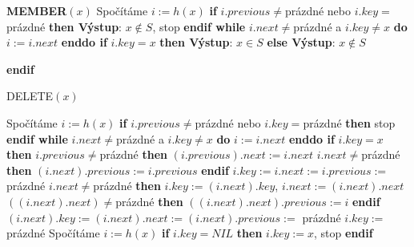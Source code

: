 \documentclass[a4paper,12pt]{article}
\begin{document}
{\bf MEMBER$(x)$}\newline 
Spočítáme $i:=h(x)$\newline 
{\bf if} $i.previous\ne$prázdné nebo $i.key=$prázdné {\bf then Výstup}: $
x\notin S$, stop {\bf endif \newline 
while} $i.next\ne$prázdné a $i.key\ne x$ {\bf do} $i:=i.next$ {\bf enddo\newline 
if} $i.key=x$ {\bf then Výstup}: $x\in S$ {\bf else Výstup}: $
x\notin S$ {\bf endif

DELETE$(x)$}\newline 
Spočítáme $i:=h(x)$\newline 
{\bf if} $i.previous\ne$prázdné nebo $i.key=$prázdné {\bf then} stop {\bf endif\newline 
while} $i.next\ne$prázdné a $i.key\ne x$ {\bf do} $i:=i.next$ {\bf enddo \newline 
if} $i.key=x$ {\bf then}\newline  
\phantom{---}{\bf if} $i.previous\ne$prázdné {\bf then}\newline 
\phantom{------}$(i.previous).next:=i.next$\newline 
\phantom{------}{\bf if} $i.next\ne$prázdné {\bf then} $(i.n
ext).previous:=i.previous$ {\bf endif}\newline 
\phantom{------}$i.key:=i.next:=i.previous:=$ prázdné \newline 
\phantom{---}{\bf else}\newline 
\phantom{------}{\bf if} $i.next\ne$prázdné {\bf then}\newline 
\phantom{---------}$i.key:=(i.next).key$, $i.next:=(i.next).next$\newline 
\phantom{---------}{\bf if} $((i.next).next)\ne$prázdné {\bf then} $
((i.next).next).previous:=i$ {\bf endif}\newline 
\phantom{---------}$(i.next).key:=(i.next).next:=(i.next).previous:=$ prázdné \newline 
\phantom{------}{\bf else}\newline 
\phantom{---------}$i.key:=$ prázdné \newline 
\phantom{------}{\bf endif}\newline 
\phantom{---}{\bf endif\newline 
endif
\bigskip

INSERT$(x)$}\newline 
Spočítáme $i:=h(x)$\newline
{\bf if} $i.key=NIL$ {\bf then} $i.key:=x$, stop {\bf endif}\newline 
\end{document}
